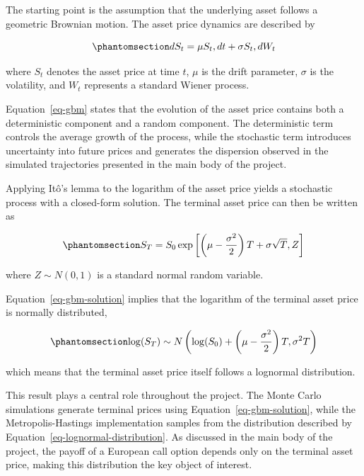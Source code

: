 \documentclass[
  12pt,
  letterpaper,
]{book}
\begin{document}
The starting point is the assumption that the underlying asset follows a
geometric Brownian motion. The asset price dynamics are described by

\begin{equation}\phantomsection\label{eq-gbm}{
dS_t = \mu S_t,dt + \sigma S_t,dW_t
}\end{equation}

where \(S_t\) denotes the asset price at time \(t\), \(\mu\) is the
drift parameter, \(\sigma\) is the volatility, and \(W_t\) represents a
standard Wiener process.

Equation~\ref{eq-gbm} states that the evolution of the asset price
contains both a deterministic component and a random component. The
deterministic term controls the average growth of the process, while the
stochastic term introduces uncertainty into future prices and generates
the dispersion observed in the simulated trajectories presented in the
main body of the project.

Applying Itô's lemma to the logarithm of the asset price yields a
stochastic process with a closed-form solution. The terminal asset price
can then be written as

\begin{equation}\phantomsection\label{eq-gbm-solution}{
S_T = S_0 \exp\left[\left(\mu-\frac{\sigma^2}{2}\right)T + \sigma\sqrt{T},Z\right]
}\end{equation}

where \(Z \sim N(0,1)\) is a standard normal random variable.

Equation~\ref{eq-gbm-solution} implies that the logarithm of the
terminal asset price is normally distributed,

\begin{equation}\phantomsection\label{eq-lognormal-distribution}{
\log(S_T)
\sim
N
\left(
\log(S_0) + \left(\mu-\frac{\sigma^2}{2}\right)T,
\sigma^2T
\right)
}\end{equation}

which means that the terminal asset price itself follows a lognormal
distribution.

This result plays a central role throughout the project. The Monte Carlo
simulations generate terminal prices using
Equation~\ref{eq-gbm-solution}, while the Metropolis-Hastings
implementation samples from the distribution described by
Equation~\ref{eq-lognormal-distribution}. As discussed in the main body
of the project, the payoff of a European call option depends only on the
terminal asset price, making this distribution the key object of
interest.
\end{document}
